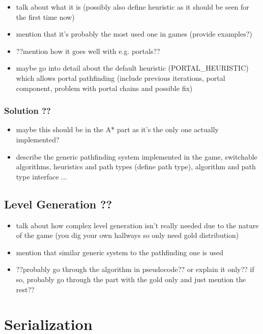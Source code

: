 \begin{itemize}
	\item talk about what it is (possibly also define heuristic as it should
		be seen for the first time now)
	\item mention that it's probably the most used one in games (provide examples?)
	\item ??mention how it goes well with e.g. portals??
	\item maybe go into detail about the default heuristic (PORTAL\_HEURISTIC) which
		allows portal pathfinding (include previous iterations, portal component,
		problem with portal chains and possible fix)
\end{itemize}

\subsubsection{Solution ??}

\begin{itemize}
    \item maybe this should be in the A* part as it's the only one actually implemented?
    \item describe the generic pathfinding system implemented in the game, switchable
	    algorithms, heuristics and path types (define path type),
	    algorithm and path type interface ...
\end{itemize}

\subsection{Level Generation ??}

\begin{itemize}
    \item talk about how complex level generation isn't really needed due
	    to the nature of the game (you dig your own hallways so only need
	    gold distribution)
    \item mention that similar generic system to the pathfinding one is used
    \item ??probably go through the algorithm in pseudocode?? or explain it only??
	    if so, probably go through the part with the gold only and just mention
	    the rest??
\end{itemize}

\section{Serialization}


